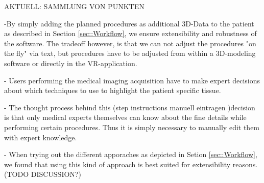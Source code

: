 AKTUELL: SAMMLUNG VON PUNKTEN

-By simply adding the planned procedures as additional 3D-Data to the patient as described in Section \ref{sec::Workflow}, we ensure extensibility and robustness of the software.
The tradeoff however, is that we can not adjust the procedures "on the fly" via text, but procedures have to be adjusted from within a 3D-modeling software or directly in the VR-application.

- Users performing the medical imaging acquisition have to make expert decisions about which techniques to use to highlight the patient specific tissue.

- The thought process behind this (step instructions manuell eintragen )decision is that only medical experts themselves can know about the fine details while performing certain procedures.
Thus it is simply necessary to manually edit them with expert knowledge.

- When trying out the different apporaches as depicted in Setion \ref{sec::Workflow}, we found that using this kind of approach is best suited for extensibility reasons. (TODO DISCUSSION?)

